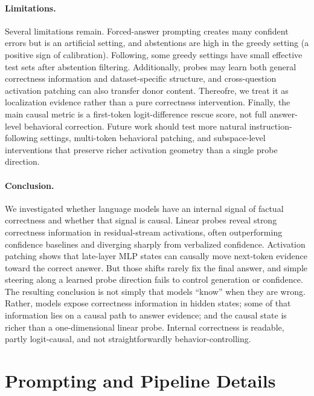 \documentclass{article}
\begin{document}
\paragraph{Limitations.} Several limitations remain. Forced-answer prompting creates many confident errors but is an artificial setting, and abstentions are high in the greedy setting (a positive sign of calibration). Following, some greedy settings have small effective test sets after abstention filtering. Additionally, probes may learn both general correctness information and dataset-specific structure, and cross-question activation patching can also transfer donor content. Thereofre, we treat it as localization evidence rather than a pure correctness
intervention. Finally, the main causal metric is a first-token logit-difference rescue score, not full answer-level behavioral correction. Future work should test more natural instruction-following settings, multi-token behavioral patching, and subspace-level interventions that preserve richer activation geometry than a single probe direction.

\paragraph{Conclusion.} We investigated whether language models have an internal signal of factual correctness and whether that signal is causal. Linear probes reveal strong correctness information in residual-stream activations, often outperforming confidence baselines and diverging sharply from verbalized confidence. Activation patching shows that late-layer MLP states can causally move next-token evidence toward the correct answer. But those shifts rarely fix the final answer, and simple steering along a learned probe direction fails to control generation or confidence. The resulting conclusion is not simply that models ``know'' when they are wrong. Rather, models expose correctness information in hidden states; some of that information lies on a causal path to answer evidence; and the causal state is richer than a one-dimensional linear probe. Internal correctness is readable, partly logit-causal, and not straightforwardly behavior-controlling.




\appendix

\section{Prompting and Pipeline Details}
\label{app:pipeline}
\end{document}
